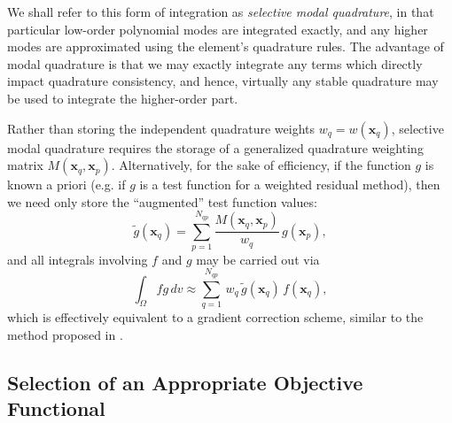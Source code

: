 	We shall refer to this form of integration as \textit{selective modal quadrature}, in that particular low-order polynomial modes are integrated exactly, and any higher modes are approximated using the element's quadrature rules. The advantage of modal quadrature is that we may exactly integrate any terms which directly impact quadrature consistency, and hence, virtually any stable quadrature may be used to integrate the higher-order part.
	
	Rather than storing the independent quadrature weights $w_q = w (\mathbf{x}_q)$, selective modal quadrature requires the storage of a generalized quadrature weighting matrix $M (\mathbf{x}_q,\mathbf{x}_p)$. Alternatively, for the sake of efficiency, if the function $g$ is known a priori (e.g. if $g$ is a test function for a weighted residual method), then we need only store the ``augmented'' test function values:
	\begin{equation}
		\tilde{g} (\mathbf{x}_q) = \sum_{p = 1}^{N_{qp}} \frac{M(\mathbf{x}_q,\mathbf{x}_p)}{w_q} \, g (\mathbf{x}_p),
	\end{equation}		
	and all integrals involving $f$ and $g$ may be carried out via
	\begin{equation}
		\int_\Omega f g \, dv \approx \sum_{q = 1}^{N_{qp}} \, w_q \, \tilde{g} (\mathbf{x}_q) \, f (\mathbf{x}_q),
	\end{equation}
	which is effectively equivalent to a gradient correction scheme, similar to the method proposed in \cite{Talischi:15}.

\subsection{Selection of an Appropriate Objective Functional}


